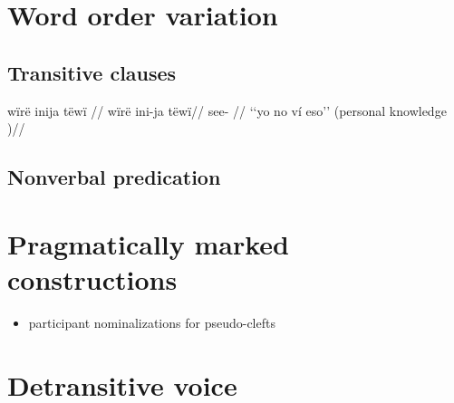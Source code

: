 \documentclass{memoir}
\begin{document}
\chapter{\texorpdfstring{Word order variation
\label{wordorder}}{Word order variation }}

\section{Transitive clauses}

\ex \label{histyarirdi-615}
\begingl \glpreamble wïrë inija tëwï //
\gla wïrë ini-ja tëwï//
\glb {} see- //
\glft ‘‘yo no ví eso’’ (personal knowledge
)//
\endgl
\xe

\section{\texorpdfstring{Nonverbal predication
\label{nvp-order}}{Nonverbal predication }}

\chapter{\texorpdfstring{Pragmatically marked constructions
\label{pragmarked}}{Pragmatically marked constructions }}

\begin{itemize}
\tightlist
\item
  participant nominalizations for pseudo-clefts
\end{itemize}

\chapter{\texorpdfstring{Detransitive voice
\label{voice}}{Detransitive voice }}
\end{document}
